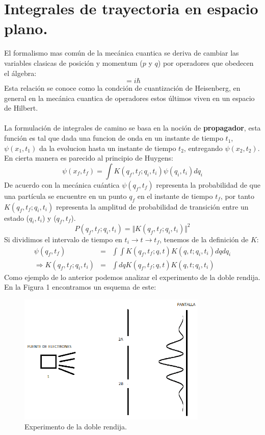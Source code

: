 \chapter{Integrales de trayectoria	 en espacio plano.}
El formalismo mas común de la mecánica cuantica se deriva de cambiar las variables clasicas de posición y momentum ($p$ y $q$) por operadores que obedecen el álgebra:
\begin{equation}
[\hat{q},\hat{p}]=i\hbar
\end{equation}
Esta relación se conoce como la condción de cuantización de Heisenberg, en general en la mecánica cuantica de operadores estos últimos viven en un espacio de Hilbert.
\\
\\
La formulación de integrales de camino se basa en la noción de \textbf{propagador}, esta función es tal que dada una funcion de onda en un instante de tiempo $t_1$, $\psi(x_1,t_1)$ da la evolucion hasta un instante de tiempo $t_2$, entregando $\psi(x_2,t_2)$. En cierta manera es parecido al principio de Huygens:
\begin{equation}
\psi(x_f,t_f)=\int K(q_f,t_f;q_i,t_i)\psi(q_i,t_i)dq_i
\end{equation}
De acuerdo con la mecánica cuántica $\psi(q_f,t_f)$ representa la probabilidad de que una partícula se encuentre en un punto $q_f$ en el instante de tiempo $t_f$, por tanto $K(q_f,t_f;q_i,t_i)$ representa la amplitud de probabilidad de transición entre un estado ($q_i,t_i$) y ($q_f,t_f$).
\begin{equation}
P(q_f,t_f;q_i,t_i)=\Vert K(q_f,t_f;q_i,t_i) \Vert^2
\end{equation}
Si dividimos el intervalo de tiempo en $t_i\rightarrow t \rightarrow t_f$, tenemos de la definición de $K$:
\begin{eqnarray}
\nonumber \psi(q_f,t_f)&=&\int\int K(q_f,t_f;q,t)K(q,t;q_i,t_i)dqdq_i\\
\Rightarrow K(q_f,t_f;q_i,t_i)&=&\int dq K(q_f,t_f;q,t)K(q,t;q_i,t_i)
\end{eqnarray}
Como ejemplo de lo anterior podemos analizar el experimento de la doble rendija. En la Figura 1 encontramos un esquema de este:
\begin{figure}[h]
\centering
\includegraphics[width=9cm]{Imagenes/Fig1}
\caption[Esquema del experimento de la doble rendija]{Experimento de la doble rendija.}
\end{figure}
